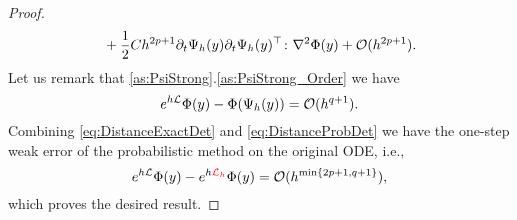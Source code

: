 \documentclass[10pt]{article}
\begin{document}
\begin{proof}
\begin{equation}
\begin{aligned}
			&\quad +\frac{1}{2}Ch^{2p+1}\partial_t \Psi_h(y) \partial_t \Psi_h(y)^\top  \colon \nabla^2\Phi(y) + \mathcal{O}(h^{2p+1}).
		\end{aligned}
	\end{equation}
	Let us remark that  \cref{as:PsiStrong}.\ref{as:PsiStrong_Order} we have
	\begin{equation}\label{eq:DistanceExactDet}
		e^{h\mathcal{L}}\Phi(y) - \Phi(\Psi_h(y)) = \mathcal{O}(h^{q+1}).
	\end{equation}
	Combining \eqref{eq:DistanceExactDet} and \eqref{eq:DistanceProbDet} we have the one-step weak error of the probabilistic method on the original ODE, i.e., 
	\begin{equation}\label{eq:LocalWeakError}
		e^{h\mathcal{L}}\Phi(y) - e^{h{\color{red}\mathcal{L}_h}}\Phi(y) = \mathcal{O}(h^{\min\{2p+1, q+1\}}),
	\end{equation}
	which proves the desired result.
\end{proof}

\end{document}

